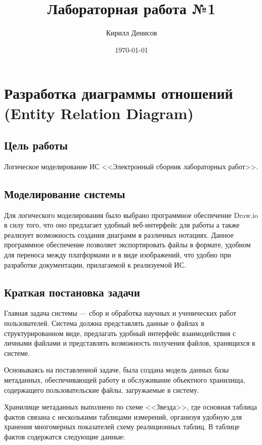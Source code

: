 \documentclass[a4paper,14pt]{extarticle}
\author{Кирилл Денисов}
\title{Лабораторная работа №1}
\date{\today}
\newcommand{\pathToCommonFolder}{/home/denilai/Documents/repos/latex/Common}
\begin{document}
	\thispagestyle{empty}
	
	\newpage
	\newpage
	
\normalsize

\section{Разработка диаграммы отношений (Entity Relation Diagram)}
\subsection{Цель работы}
Логическое моделирование ИС <<Электронный сборник лабораторных работ>>.
\subsection{Моделирование системы}
Для логического моделирования было выбрано программное обеспечение Draw.io в силу того, что оно предлагает удобный веб-интерфейс для работы а также реализует возможность создания диаграмм в различных нотациях. Данное программное обеспечение позволяет экспортировать файлы в формате, удобном для переноса между платформами и в виде изображений, что удобно при разработке документации, прилагаемой к реализуемой ИС.

\subsection{Краткая постановка задачи}
Главная задача системы --- сбор и обработка научных и ученических работ пользователей. Система должна представлять данные о файлах в структурированном виде, предлагать удобный интерфейс взаимодействия с личными файлами и представлять возможность получения файлов, хранящихся в системе.

Основываясь на поставленной задаче, была создана модель данных базы метаданных, обеспечивающей работу и обслуживание объектного хранилища, содержащего пользовательские файлы, загружаемые в систему.

Хранилище метаданных выполнено по схеме <<Звезда>>, где основная таблица фактов связана с несколькими таблицами измерений, организуя удобную для хранения многомерных показателей схему реалиционных таблиц.
\newpage
В таблице фактов содержатся следующие данные:
\end{document}
